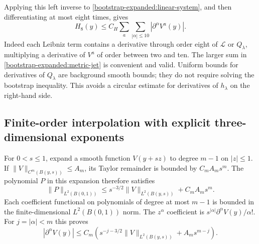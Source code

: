 \documentclass[11pt]{article}
\theoremstyle{definition}
\theoremstyle{remark}
\numberwithin{equation}{section}
\begin{document}
Applying this left inverse to \eqref{bootstrap-expanded:linear-system}, and then
differentiating at most eight times, gives
\begin{equation}
 H_8(y)\leq C_H\sum_a\sum_{|\alpha|\leq10}
                                      |\partial^\alpha V^a(y)|.
 \label{bootstrap-expanded:metric-jet}
\end{equation}
Indeed each Leibniz term contains a derivative through order eight of
$\mathcal L$ or $Q_\lambda$, multiplying a derivative of $V^a$ of
order between two and ten.  The larger sum in
\eqref{bootstrap-expanded:metric-jet} is convenient and valid.  Uniform bounds
for derivatives of $Q_\lambda$ are background smooth bounds; they do
not require solving the bootstrap inequality.  This avoids a circular
estimate for derivatives of $h_\lambda$ on the right-hand side.

\subsection{Finite-order interpolation with explicit three-dimensional exponents}
\label{bootstrap-expanded:interpolation}

For $0<s\leq1$, expand a smooth function $V(y+sz)$ to degree $m-1$
on $|z|\leq1$.  If $\|V\|_{C^m(B(y,s))}\leq A_m$, its Taylor
remainder is bounded by $C_mA_ms^m$.  The polynomial $P$ in this
expansion therefore satisfies
\[
 \|P\|_{L^2(B(0,1))}
       \leq s^{-3/2}\|V\|_{L^2(B(y,s))}+C_mA_ms^m.
\]
Each coefficient functional on polynomials of degree at most $m-1$
is bounded in the finite-dimensional $L^2(B(0,1))$ norm.  The
$z^\alpha$ coefficient is
$s^{|\alpha|}\partial^\alpha V(y)/\alpha!$.  For $j=|\alpha|<m$
this proves
\begin{equation}
 |\partial^\alpha V(y)|\leq C_m
   \left(s^{-j-3/2}\|V\|_{L^2(B(y,s))}+A_ms^{m-j}\right).
 \label{bootstrap-expanded:interpolation-bound}
\end{equation}
\end{document}
